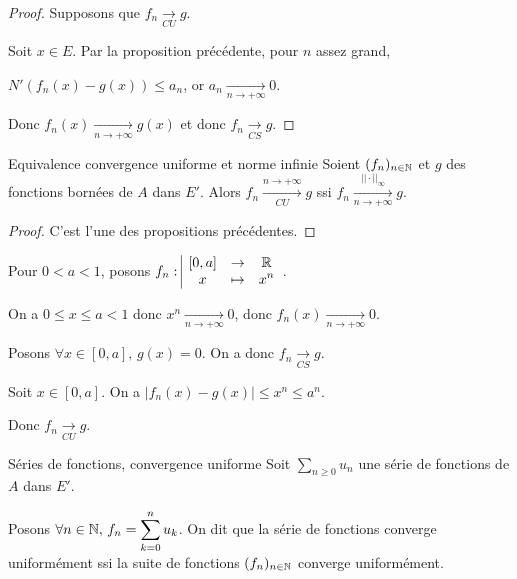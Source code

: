 
\begin{proof}
    Supposons que $f_n \xrightarrow[CU]{} g$.

    Soit $x \in E$. Par la proposition précédente, pour $n$ assez grand,

    $N'(f_n(x) - g(x)) \leqslant a_n$, or $a_n \xrightarrow[n\to +\infty]{} 0$.

    Donc $f_n(x) \xrightarrow[n\to +\infty]{} g(x)$ et donc $f_n \xrightarrow[CS]{} g$.
\end{proof}

\begin{proposition}{Equivalence convergence uniforme et norme infinie}{}
    Soient $(f_n)_{n \in \mathbb{N}}$ et $g$ des fonctions bornées de $A$ dans $E'$.
    Alors $f_n \xrightarrow[CU]{n \to + \infty} g$ ssi $\displaystyle f_n \xrightarrow[n \to + \infty]{||\cdot ||_{\infty}} g$.
\end{proposition}

\begin{proof}
    C'est l'une des propositions précédentes.
\end{proof}

\begin{exemple}
    Pour $0 < a < 1$, posons $\displaystyle f_n: \space \begin{array}{|ccc} \displaystyle [0, a] & \to & \displaystyle \mathbb{R} \\ \displaystyle x & \mapsto & \displaystyle x^n \end{array}$.


    \avspace On a $0 \leqslant x \leqslant a < 1$ donc $x^n \xrightarrow[n\to +\infty]{} 0$, donc 
    $f_n(x) \xrightarrow[n\to +\infty]{} 0$.

    Posons $\forall x \in [0, a], \, g(x) = 0$. On a donc $f_n \xrightarrow[CS]{} g$.


    \avspace Soit $x \in [0, a]$. On a $\displaystyle |f_n(x) - g(x)| \leqslant x^n \leqslant a^n$.

    Donc $f_n \xrightarrow[CU]{} g$.
\end{exemple}


\begin{definition}{Séries de fonctions, convergence uniforme}{}
    Soit $ \sum_{n \geqslant 0} u_n$ une série de fonctions de $A$ dans $E'$. 

    Posons $\displaystyle \forall n \in \mathbb{N}, \, f_n = \sum_{k = 0}^n u_k$. On dit que la série de fonctions converge 
    uniformément ssi la suite de fonctions $(f_n)_{n \in \mathbb{N}}$ converge uniformément.
\end{definition}

